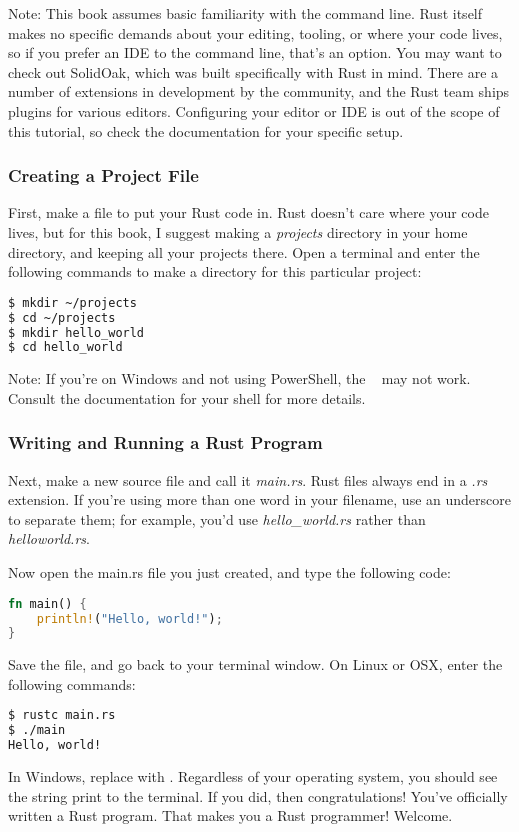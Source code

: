 \begin{myquote}
    Note: This book assumes basic familiarity with the command line. Rust itself makes no specific demands about your editing, tooling, 
    or where your code lives, so if you prefer an IDE to the command line, that's an option. You may want to check out SolidOak, which 
    was built specifically with Rust in mind. There are a number of extensions in development by the community, and the Rust team ships 
    plugins for various editors. Configuring your editor or IDE is out of the scope of this tutorial, so check the documentation for 
    your specific setup.
\end{myquote}

\subsubsection*{Creating a Project File}

First, make a file to put your Rust code in. Rust doesn't care where your code lives, but for this book, I suggest making a 
\emph{projects} directory in your home directory, and keeping all your projects there. Open a terminal and enter the following 
commands to make a directory for this particular project:
\begin{lstlisting}[language=Bash]
$ mkdir ~/projects
$ cd ~/projects
$ mkdir hello_world
$ cd hello_world
\end{lstlisting}

\begin{myquote}
Note: If you’re on Windows and not using PowerShell, the ~ may not work. Consult the documentation for your shell for more details.
\end{myquote}

\subsubsection*{Writing and Running a Rust Program}

Next, make a new source file and call it \emph{main.rs}. Rust files always end in a \emph{.rs} extension. If you’re using more 
than one word in your filename, use an underscore to separate them; for example, you'd use \emph{hello\_world.rs} rather than 
\emph{helloworld.rs}.

\blank
Now open the main.rs file you just created, and type the following code:

\begin{lstlisting}[language=Rust]
fn main() {
    println!("Hello, world!");
}
\end{lstlisting}

Save the file, and go back to your terminal window. On Linux or OSX, enter the following commands:

\begin{lstlisting}[language=Bash]
$ rustc main.rs
$ ./main
Hello, world!
\end{lstlisting}

In Windows, replace  with . Regardless of your operating system, you should see the string 
 print to the terminal. If you did, then congratulations! You've officially written a Rust program. 
That makes you a Rust programmer! Welcome.

